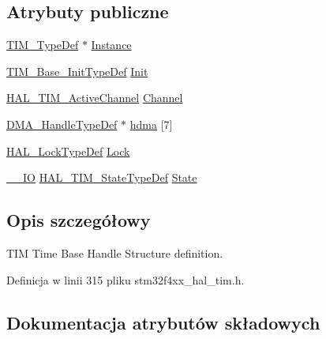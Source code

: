 \subsection*{Atrybuty publiczne}
\begin{DoxyCompactItemize}
\item 
\hyperlink{struct_t_i_m___type_def}{T\+I\+M\+\_\+\+Type\+Def} $\ast$ \hyperlink{struct_t_i_m___handle_type_def_ad0c5f736a15f6d8d14724854c8133bcc}{Instance}
\item 
\hyperlink{struct_t_i_m___base___init_type_def}{T\+I\+M\+\_\+\+Base\+\_\+\+Init\+Type\+Def} \hyperlink{struct_t_i_m___handle_type_def_a8b2e61c3c4128e62cb7be7d35048152e}{Init}
\item 
\hyperlink{group___t_i_m___exported___types_gaa3fa7bcbb4707f1151ccfc90a8cf9706}{H\+A\+L\+\_\+\+T\+I\+M\+\_\+\+Active\+Channel} \hyperlink{struct_t_i_m___handle_type_def_ae9c5a11c1f5b27c808c0aca453e63870}{Channel}
\item 
\hyperlink{group___d_m_a___exported___types_ga41b754a906b86bce54dc79938970138b}{D\+M\+A\+\_\+\+Handle\+Type\+Def} $\ast$ \hyperlink{struct_t_i_m___handle_type_def_a15338c71de82fa178c685be868e694bd}{hdma} \mbox{[}7\mbox{]}
\item 
\hyperlink{stm32f4xx__hal__def_8h_ab367482e943333a1299294eadaad284b}{H\+A\+L\+\_\+\+Lock\+Type\+Def} \hyperlink{struct_t_i_m___handle_type_def_a2a24b963b57150ed2fb0f051cd87b65a}{Lock}
\item 
\hyperlink{core__sc300_8h_aec43007d9998a0a0e01faede4133d6be}{\+\_\+\+\_\+\+IO} \hyperlink{group___t_i_m___exported___types_gae0994cf5970e56ca4903e9151f40010c}{H\+A\+L\+\_\+\+T\+I\+M\+\_\+\+State\+Type\+Def} \hyperlink{struct_t_i_m___handle_type_def_a6b6eeaf94f2e6e3d0a5bdac44adf21d6}{State}
\end{DoxyCompactItemize}


\subsection{Opis szczegółowy}
T\+IM Time Base Handle Structure definition. 

Definicja w linii 315 pliku stm32f4xx\+\_\+hal\+\_\+tim.\+h.



\subsection{Dokumentacja atrybutów składowych}
\mbox{\label{struct_t_i_m___handle_type_def_ae9c5a11c1f5b27c808c0aca453e63870}} 
